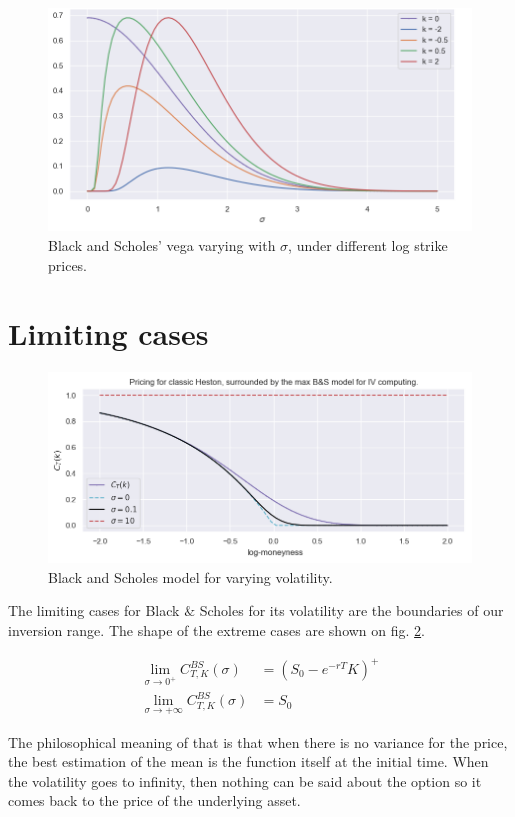 \begin{figure}
\centering
\includegraphics[width = 0.7  \textwidth]{../addition_part/images/annexe/vega.png}
\caption{Black and Scholes' vega varying with $\sigma$, under different log strike prices.}
\label{fig:vegabs}
\end{figure}










\section{Limiting cases}

\begin{figure}
\centering
\includegraphics[width = \textwidth ]{../addition_part/images/annexe/pricing_IV.png}
\caption{Black and Scholes model for varying volatility.}
\label{fig:BSvolatilitymaxcase}
\end{figure}

The limiting cases for Black $\&$ Scholes for its volatility are the boundaries of our inversion range. The shape of the extreme cases are shown on fig. \ref{fig:BSvolatilitymaxcase}.

\begin{theoreme}{}
\begin{align}
\lim_{ \sigma \to 0^+} C_{T,K}^{BS} (\sigma) &= (S_0 - e^{-rT} K)^+ \\
\lim_{ \sigma \to +\infty } C_{T,K}^{BS} (\sigma) &= S_0  
\end{align} 
 
\end{theoreme}
\begin{remarque}
The philosophical meaning of that is that when there is no variance for the price, the best estimation of the mean is the function itself at the initial time. When the volatility goes to infinity, then nothing can be said about the option so it comes back to the price of the underlying asset.
\end{remarque}

